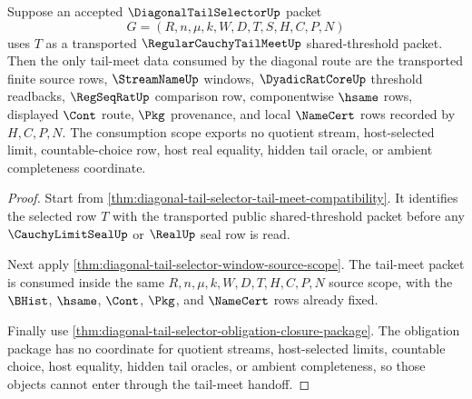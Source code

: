 \begin{theorem}
\label{thm:diagonal-tail-selector-tail-meet-consumption-scope}
Suppose an accepted $\DiagonalTailSelectorUp$ packet
$$
G=(R,n,\mu,k,W,D,T,S,H,C,P,N)
$$
uses $T$ as a transported $\RegularCauchyTailMeetUp$ shared-threshold packet.
Then the only tail-meet data consumed by the diagonal route are the
transported finite source rows, $\StreamNameUp$ windows, $\DyadicRatCoreUp$
threshold readbacks, $\RegSeqRatUp$ comparison row, componentwise $\hsame$
rows, displayed $\Cont$ route, $\Pkg$ provenance, and local $\NameCert$ rows
recorded by $H,C,P,N$. The consumption scope exports no quotient stream,
host-selected limit, countable-choice row, host real equality, hidden tail
oracle, or ambient completeness coordinate.
\end{theorem}
\begin{proof}
Start from \autoref{thm:diagonal-tail-selector-tail-meet-compatibility}. It
identifies the selected row $T$ with the transported public
shared-threshold packet before any $\CauchyLimitSealUp$ or $\RealUp$ seal row
is read.

Next apply \autoref{thm:diagonal-tail-selector-window-source-scope}. The
tail-meet packet is consumed inside the same $R,n,\mu,k,W,D,T,H,C,P,N$
source scope, with the $\BHist$, $\hsame$, $\Cont$, $\Pkg$, and
$\NameCert$ rows already fixed.

Finally use \autoref{thm:diagonal-tail-selector-obligation-closure-package}.
The obligation package has no coordinate for quotient streams, host-selected
limits, countable choice, host equality, hidden tail oracles, or ambient
completeness, so those objects cannot enter through the tail-meet handoff.
\end{proof}

